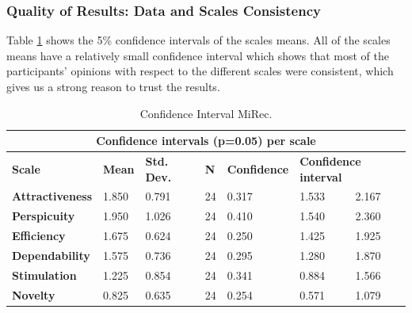 \subsubsection{Quality of Results: Data and Scales Consistency}
Table \ref{table:table55} shows the 5\% confidence intervals of
the scales means. All of the scales means have a relatively small confidence
interval which shows that most of the participants' opinions with respect to
the different scales were consistent, which gives us a strong reason to trust
the results.\\
\begin{table}[!htbp]
\tiny
\centering
\begin{tabular}{|l|l|l|l|l|l|l|}
\hline
\multicolumn{7}{|c|}{\textbf{Confidence intervals (p=0.05) per scale}}                                                                              \\ \hline
\textbf{Scale}          & \textbf{Mean} & \textbf{Std. Dev.} & \textbf{N} & \textbf{Confidence} & \multicolumn{2}{l|}{\textbf{Confidence interval}} \\ \hline
\textbf{Attractiveness} & 1.850         & 0.791              & 24         & 0.317               & 1.533                   & 2.167                   \\ \hline
\textbf{Perspicuity}    & 1.950         & 1.026              & 24         & 0.410               & 1.540                   & 2.360                   \\ \hline
\textbf{Efficiency}     & 1.675         & 0.624              & 24         & 0.250               & 1.425                   & 1.925                   \\ \hline
\textbf{Dependability}  & 1.575         & 0.736              & 24         & 0.295               & 1.280                   & 1.870                   \\ \hline
\textbf{Stimulation}    & 1.225         & 0.854              & 24         & 0.341               & 0.884                   & 1.566                   \\ \hline
\textbf{Novelty}        & 0.825         & 0.635              & 24         & 0.254               & 0.571                   & 1.079                   \\ \hline
\end{tabular}
\caption{Confidence Interval MiRec.}
\label{table:table55}
\end{table}
